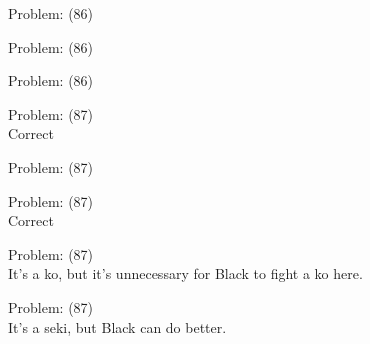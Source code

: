\documentclass[11pt]{article}
\begin{document}
\begin{minipage}[t]{0.5\textwidth}
  {\centering
  
  Problem: (86)\\
  
  }
\end{minipage}
\begin{minipage}[t]{0.5\textwidth}
  {\centering
  
  Problem: (86)\\
  
  }
\end{minipage}
\begin{minipage}[t]{0.5\textwidth}
  {\centering
  
  Problem: (86)\\
  
  }
\end{minipage}
\begin{minipage}[t]{0.5\textwidth}
  {\centering
  
  Problem: (87)\\
  Correct\\
  }
\end{minipage}
\begin{minipage}[t]{0.5\textwidth}
  {\centering
  
  Problem: (87)\\
  
  }
\end{minipage}
\begin{minipage}[t]{0.5\textwidth}
  {\centering
  
  Problem: (87)\\
  Correct\\
  }
\end{minipage}
\begin{minipage}[t]{0.5\textwidth}
  {\centering
  
  Problem: (87)\\
  It's a ko, but it's unnecessary for Black to fight a ko here.\\
  }
\end{minipage}
\begin{minipage}[t]{0.5\textwidth}
  {\centering
  
  Problem: (87)\\
  It's a seki, but Black can do better.\\
  }
\end{minipage}
\end{document}
